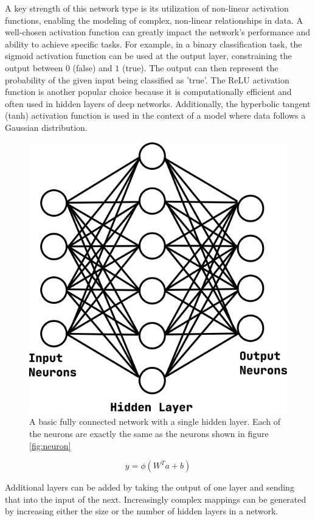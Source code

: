 A key strength of this network type is its utilization of non-linear activation functions, enabling the modeling of complex, non-linear relationships in data.
A well-chosen activation function can greatly impact the network's performance and ability to achieve specific tasks.
For example, in a binary classification task, the sigmoid activation function can be used at the output layer, constraining the output between $0$ (false) and $1$ (true).
The output can then represent the probability of the given input being classified as 'true'.
The ReLU activation function is another popular choice because it is computationally efficient and often used in hidden layers of deep networks. Additionally, the hyperbolic tangent (tanh) activation function is used in the context of a model where data follows a Gaussian distribution.

\begin{figure}[h!]
    \centering
    \includegraphics[width=0.7\linewidth]{figs/background/png/fcn.png}
    \caption[A basic fully connected network with a single hidden layer]{A basic fully connected network with a single hidden layer. Each of the neurons are exactly the same as the neurons shown in figure \ref{fig:neuron}}
    \label{fig:fcn}
\end{figure}

\begin{equation}
    y = \phi(W^{T}a + b)
    \label{eq:fcn}
\end{equation}

Additional layers can be added by taking the output of one layer and sending that into the input of the next. Increasingly complex mappings can be generated by increasing either the size or the number of hidden layers in a network.

